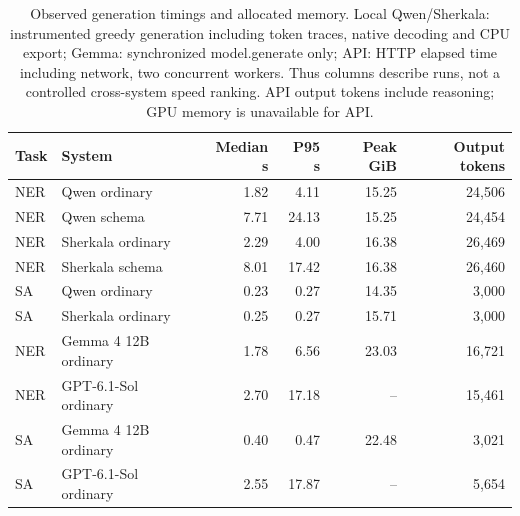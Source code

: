 \begin{table}[t]
\centering\footnotesize
\caption{Observed generation timings and allocated memory. Local Qwen/Sherkala: instrumented greedy generation including token traces, native decoding and CPU export; Gemma: synchronized model.generate only; API: HTTP elapsed time including network, two concurrent workers. Thus columns describe runs, not a controlled cross-system speed ranking. API output tokens include reasoning; GPU memory is unavailable for API.}
\label{tab:operations}
\begin{tabular}{llrrrr}
\toprule
Task & System & Median s & P95 s & Peak GiB & Output tokens\\
\midrule
NER & Qwen ordinary & 1.82 & 4.11 & 15.25 & 24,506\\
NER & Qwen schema & 7.71 & 24.13 & 15.25 & 24,454\\
NER & Sherkala ordinary & 2.29 & 4.00 & 16.38 & 26,469\\
NER & Sherkala schema & 8.01 & 17.42 & 16.38 & 26,460\\
SA & Qwen ordinary & 0.23 & 0.27 & 14.35 & 3,000\\
SA & Sherkala ordinary & 0.25 & 0.27 & 15.71 & 3,000\\
NER & Gemma 4 12B ordinary & 1.78 & 6.56 & 23.03 & 16,721\\
NER & GPT-6.1-Sol ordinary & 2.70 & 17.18 & -- & 15,461\\
SA & Gemma 4 12B ordinary & 0.40 & 0.47 & 22.48 & 3,021\\
SA & GPT-6.1-Sol ordinary & 2.55 & 17.87 & -- & 5,654\\
\bottomrule
\end{tabular}
\end{table}
